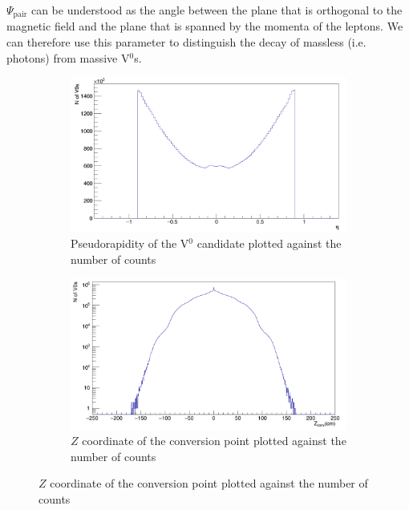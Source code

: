 $\Psi_{\mathrm{pair}}$ can be understood as the angle between the plane that is orthogonal to the magnetic field and the plane that is spanned by the momenta of the leptons. We can therefore use this parameter to distinguish the decay of massless (i.e. photons) from massive V$^0$s. \\
\begin{figure}
\centering
\begin{subfigure}[h]{.4\linewidth}
\includegraphics[width=1.0\linewidth]{Figures/V0cuts/V0eta.png}
\caption{Pseudorapidity of the V$^0$ candidate plotted against the number of counts}
\label{fig:V0eta}
\end{subfigure}\hspace{1cm}%
\begin{subfigure}[h]{.4\linewidth}
\includegraphics[width=1.0\linewidth]{Figures/V0cuts/V0Z.png}
\caption{$Z$ coordinate of the conversion point plotted against the number of counts}
\label{fig:V0Z}
\end{subfigure}

\vspace{0.7cm}


\end{figure}
